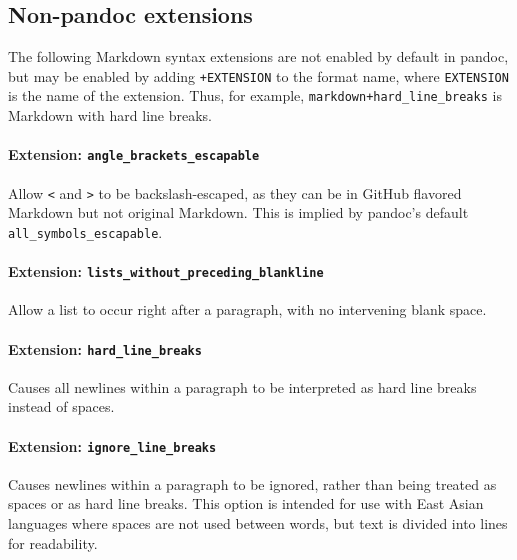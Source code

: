 \documentclass[]{article}
\let\oldparagraph\paragraph
\renewcommand{\paragraph}[1]{\oldparagraph{#1}\mbox{}}
\begin{document}
\hypertarget{non-pandoc-extensions}{\subsection{Non-pandoc
extensions}\label{non-pandoc-extensions}}

The following Markdown syntax extensions are not enabled by default in
pandoc, but may be enabled by adding \texttt{+EXTENSION} to the format
name, where \texttt{EXTENSION} is the name of the extension. Thus, for
example, \texttt{markdown+hard\_line\_breaks} is Markdown with hard line
breaks.

\paragraph{\texorpdfstring{Extension:
\texttt{angle\_brackets\_escapable}}{Extension: angle\_brackets\_escapable}}\label{extension-angle_brackets_escapable}

Allow \texttt{\textless{}} and \texttt{\textgreater{}} to be
backslash-escaped, as they can be in GitHub flavored Markdown but not
original Markdown. This is implied by pandoc's default
\texttt{all\_symbols\_escapable}.

\paragraph{\texorpdfstring{Extension:
\texttt{lists\_without\_preceding\_blankline}}{Extension: lists\_without\_preceding\_blankline}}\label{extension-lists_without_preceding_blankline}

Allow a list to occur right after a paragraph, with no intervening blank
space.

\paragraph{\texorpdfstring{Extension:
\texttt{hard\_line\_breaks}}{Extension: hard\_line\_breaks}}\label{extension-hard_line_breaks}

Causes all newlines within a paragraph to be interpreted as hard line
breaks instead of spaces.

\paragraph{\texorpdfstring{Extension:
\texttt{ignore\_line\_breaks}}{Extension: ignore\_line\_breaks}}\label{extension-ignore_line_breaks}

Causes newlines within a paragraph to be ignored, rather than being
treated as spaces or as hard line breaks. This option is intended for
use with East Asian languages where spaces are not used between words,
but text is divided into lines for readability.
\end{document}
